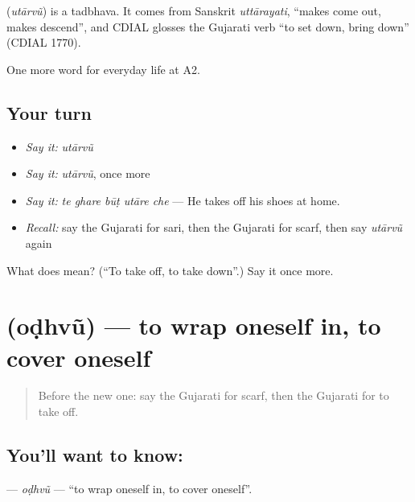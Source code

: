 \begin{cousinweb}
\textbf{} (\emph{utārvũ}) is a tadbhava. It comes from Sanskrit \emph{uttārayati}, \textquotedblleft{}makes come out, makes descend\textquotedblright{}, and CDIAL glosses the Gujarati verb \textquotedblleft{}to set down, bring down\textquotedblright{} (CDIAL 1770).
\end{cousinweb}

\begin{grammarlens}[title={What you've built}]
One more word for everyday life at A2.
\end{grammarlens}

\subsection*{Your turn}
\begin{itemize}
\raggedright
  \item \emph{Say it:} \emph{utārvũ}
  \item \emph{Say it:} \emph{utārvũ}, once more
  \item \emph{Say it:} \emph{te ghare būṭ utāre che} — He takes off his shoes at home.
  \item \emph{Recall:} say the Gujarati for sari, then the Gujarati for scarf, then say \emph{utārvũ} again
\end{itemize}

\begin{tcolorbox}[breakable,colback=teal!4,colframe=teal!35!black,title={Before you move on}]
What does  mean? (\textquotedblleft{}To take off, to take down\textquotedblright{}.) Say it once more.
\end{tcolorbox}
\section[\texorpdfstring{\gu{ઓઢવું} (oḍhvũ)}{ઓઢવું (oḍhvũ)}]{ (oḍhvũ) — to wrap oneself in, to cover oneself}

\label{lesson:GU-C154-odhvu}



\begin{quote}
Before the new one: say the Gujarati for scarf, then the Gujarati for to take off.
\end{quote}

\subsection*{You'll want to know: }
\textbf{} — \emph{oḍhvũ} — \textquotedblleft{}to wrap oneself in, to cover oneself\textquotedblright{}.

